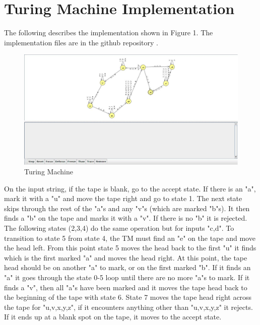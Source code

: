 \documentclass{article}
\begin{document}
\section{Turing Machine Implementation}
The following describes the implementation shown in Figure 1. The implementation files are in the github repository \cite{git}.\\
\begin{figure}[H]
  \includegraphics[width=\linewidth]{TuringMachine.jpg}
  \caption{Turing Machine}
  \label{fig:TM1}
\end{figure}
On the input string, if the tape is blank, go to the accept state. If there is an "a", mark it with a "u" and move the tape right and go to state 1. The next state skips through the rest of the "a"s and any "v"s (which are marked "b"s). It then finds a "b" on the tape and marks it with a "v". If there is no "b" it is rejected. The following states (2,3,4) do the same operation but for inputs "c,d". To transition to state 5 from state 4, the TM must find an "e" on the tape and move the head left. From this point state 5 moves the head back to the first "u" it finds which is the first marked "a" and moves the head right. At this point, the tape head should be on another "a" to mark, or on the first marked "b". If it finds an "a" it goes through the state 0-5 loop until there are no more "a"s to mark. If it finds a "v", then all "a"s have been marked and it moves the tape head back to the beginning of the tape with state 6. State 7 moves the tape head right across the tape for "u,v,x,y,z", if it encounters anything other than "u,v,x,y,z" it rejects. If it ends up at a blank spot on the tape, it moves to the accept state.\\
\end{document}

